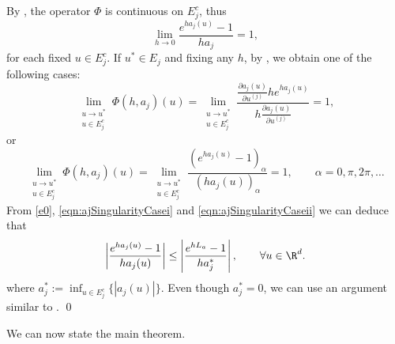 \documentclass[sort&compress, preprint]{elsarticle}
\theoremstyle{definition}
\theoremstyle{plain}%
\theoremstyle{remark}
\begin{document}
\begin{pf}    By , the operator $\Phi$ is continuous
	on $E_j^c$, thus 
	\begin{equation}\label{e0}
		\lim_{h\to 0}
		\frac{e^{ha_j(u)}-1}{ha_j}=1,
	\end{equation}
	for each fixed $u\in E_j^c$. If $u^*\in E_j$ and fixing any $h$, by ,  we obtain 
	one of the following cases:
	\begin{equation}\label{eqn:ajSingularityCasei}
				\lim_{
					\substack{
						u \to u^*\\ 
						u\in E_j^c
					}
				}
				\Phi(h,a_j)(u) =
				\lim_{
					\substack{
						u \to u^*\\ 
						u\in E_j^c
					}
				}	
				\frac{\frac{\partial a_j(u)}{\partial u^{(j)}} 
					h e^{h a_j(u)} 
				}{
					h\frac{\partial a_j(u)}{\partial u^{(j)}}
				}=1,
			\end{equation}	
or
			\begin{equation}\label{eqn:ajSingularityCaseii}
			\lim_{
				\substack{
					u \to u^*\\ 
					u\in E_j^c
				}
			}
			\Phi(h,a_j)(u) 
			=
			\lim_{
				\substack{
					u \to u^*\\ 
					u\in E_j^c
				}
			}	
			\frac{
				\left(
					 e^{h a_j(u)} - 1
				 \right)_{\alpha}
			}{
				\left(
					h a_j(u)
				\right)_{\alpha}
			}	=	1, \qquad \alpha = 0,\pi, 2\pi,\dots
		\end{equation}	
	From \eqref{e0}, \eqref{eqn:ajSingularityCasei} and \eqref{eqn:ajSingularityCaseii} we can deduce that 	
	\begin{equation}\label{eqn:PhiBound}
		\left|\frac{e^{ha_j(u)}-1}{ha_j(u)}
		\right|\leq\left|\frac{e^{hL_a}-1}{ha^*_j}
		\right|,
		\qquad \forall u \in \R^d.
	\end{equation}
	where $a^*_j:= \inf_{u\in E_j^c}\{|a_j(u)|\}$. Even though $a^*_j=0$, we can
	use an argument similar to .	\qed	
\end{pf}

We can  now state the main theorem.
\end{document}
